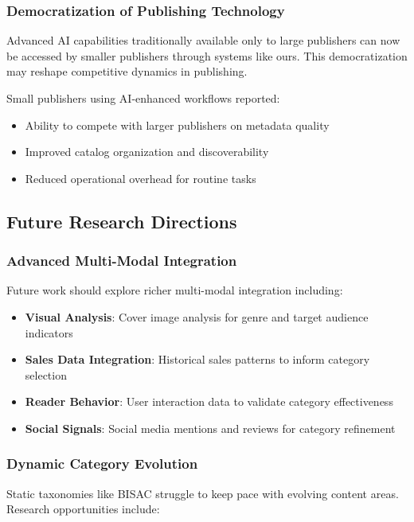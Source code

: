 \documentclass{article}
\begin{document}
\subsubsection{Democratization of Publishing Technology}

Advanced AI capabilities traditionally available only to large publishers can now be accessed by smaller publishers through systems like ours. This democratization may reshape competitive dynamics in publishing.

Small publishers using AI-enhanced workflows reported:
\begin{itemize}
\item Ability to compete with larger publishers on metadata quality
\item Improved catalog organization and discoverability
\item Reduced operational overhead for routine tasks
\end{itemize}

\subsection{Future Research Directions}

\subsubsection{Advanced Multi-Modal Integration}

Future work should explore richer multi-modal integration including:

\begin{itemize}
\item \textbf{Visual Analysis}: Cover image analysis for genre and target audience indicators
\item \textbf{Sales Data Integration}: Historical sales patterns to inform category selection
\item \textbf{Reader Behavior}: User interaction data to validate category effectiveness
\item \textbf{Social Signals}: Social media mentions and reviews for category refinement
\end{itemize}

\subsubsection{Dynamic Category Evolution}

Static taxonomies like BISAC struggle to keep pace with evolving content areas. Research opportunities include:
\end{document}
